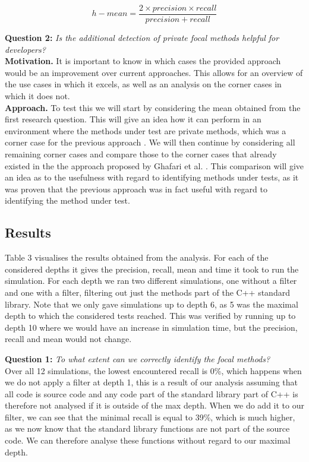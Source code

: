 \documentclass[11pt]{article}
\begin{document}
\begin{multicols}{2}
\[h-mean = \frac{2 \times precision \times recall}{precision + recall}\]

\noindent
\textbf{Question 2:} \textit{Is the additional detection of private focal methods helpful for developers?}\\
\textbf{Motivation.} It is important to know in which cases the provided approach would be an improvement over current approaches. This allows for an overview of the use cases in which it excels, as well as an analysis on the corner cases in which it does not.\\
\textbf{Approach.} To test this we will start by considering the mean obtained from the first research question. This will give an idea how it can perform in an environment where the methods under test are private methods, which was a corner case for the previous approach \cite{ghafari2015automatically}. We will then continue by considering all remaining corner cases and compare those to the corner cases that already existed in the the approach proposed by Ghafari et al. \cite{ghafari2015automatically}. This comparison will give an idea as to the usefulness with regard to identifying methods under tests, as it was proven that the previous approach was in fact useful with regard to identifying the method under test.

\subsection{Results}
Table 3 visualises the results obtained from the analysis. For each of the considered depths it gives the precision, recall, mean and time it took to run the simulation. For each depth we ran two different simulations, one without a filter and one with a filter, filtering out just the methods part of the C++ standard library. Note that we only gave simulations up to depth 6, as 5 was the maximal depth to which the considered tests reached. This was verified by running up to depth 10 where we would have an increase in simulation time, but the precision, recall and mean would not change.

\noindent 
\textbf{Question 1:} \textit{To what extent can we correctly identify the focal methods?}\\
Over all 12 simulations, the lowest encountered recall is 0\%, which happens when we do not apply a filter at depth 1, this is a result of our analysis assuming that all code is source code and any code part of the standard library part of C++ is therefore not analysed if it is outside of the max depth. When we do add it to our filter, we can see that the minimal recall is equal to 39\%, which is much higher, as we now know that the standard library functions are not part of the source code. We can therefore analyse these functions without regard to our maximal depth.


\end{multicols}
\end{document}
